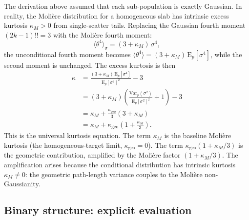 \documentclass[final,5p,times,twocolumn]{elsarticle}
\begin{document}
The derivation above assumed that each sub-population is exactly Gaussian.  In reality, the Moli\`{e}re distribution for a homogeneous slab has intrinsic excess kurtosis $\kappa_M>0$ from single-scatter tails.  Replacing the Gaussian fourth moment $(2k-1)!! = 3$ with the Moli\`{e}re fourth moment:
\begin{equation}
  \langle\theta^4\rangle_\sigma = (3+\kappa_M)\,\sigma^4,
  \label{eq:moliere_m4}
\end{equation}
the unconditional fourth moment becomes $\langle\theta^4\rangle = (3+\kappa_M)\,\mathrm{E}_p[\sigma^4]$, while the second moment is unchanged.  The excess kurtosis is then
\begin{align}
  \kappa &= \frac{(3+\kappa_M)\,\mathrm{E}_p[\sigma^4]}{\mathrm{E}_p[\sigma^2]^2} - 3 \nonumber\\
  &= (3+\kappa_M)\left(\frac{\mathrm{Var}_p(\sigma^2)}{\mathrm{E}_p[\sigma^2]^2}+1\right) - 3 \nonumber\\
  &= \kappa_M + \frac{\kappa_{\mathrm{geo}}}{3}\left(3 + \kappa_M\right) \nonumber\\
  &= \kappa_M + \kappa_{\mathrm{geo}}\!\left(1+\frac{\kappa_M}{3}\right).
  \label{eq:kappa_full}
\end{align}
This is the universal kurtosis equation.  The term $\kappa_M$ is the baseline Moli\`{e}re kurtosis (the homogeneous-target limit, $\kappa_{\mathrm{geo}}=0$).  The term $\kappa_{\mathrm{geo}}(1+\kappa_M/3)$ is the geometric contribution, amplified by the Moli\`{e}re factor $(1+\kappa_M/3)$.  The amplification arises because the conditional distribution has intrinsic kurtosis $\kappa_M\neq 0$: the geometric path-length variance couples to the Moli\`{e}re non-Gaussianity.

\subsection{Binary structure: explicit evaluation}
\label{sec:binary}
\end{document}

